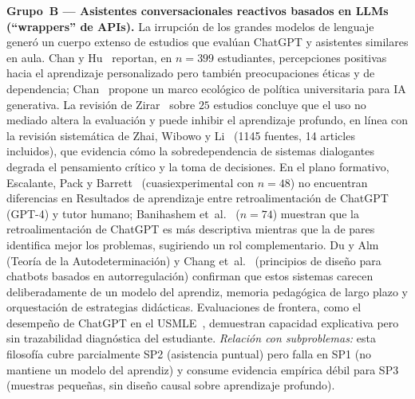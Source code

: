 \textbf{Grupo~B — Asistentes conversacionales reactivos basados en LLMs (``wrappers'' de APIs).}
La irrupción de los grandes modelos de lenguaje generó un cuerpo extenso de estudios que evalúan ChatGPT y asistentes similares en aula. Chan y Hu~\cite{chan_hu2023perceptions} reportan, en $n=399$ estudiantes, percepciones positivas hacia el aprendizaje personalizado pero también preocupaciones éticas y de dependencia; Chan~\cite{chan2023policy} propone un marco ecológico de política universitaria para IA generativa. La revisión de Zirar~\cite{zirar2023chatgpt} sobre $25$ estudios concluye que el uso no mediado altera la evaluación y puede inhibir el aprendizaje profundo, en línea con la revisión sistemática de Zhai, Wibowo y Li~\cite{zhai2024overreliance} (1145 fuentes, 14 articles incluidos), que evidencia cómo la sobredependencia de sistemas dialogantes degrada el pensamiento crítico y la toma de decisiones. En el plano formativo, Escalante, Pack y Barrett~\cite{escalante2023aifeedback} (cuasiexperimental con $n=48$) no encuentran diferencias en Resultados de aprendizaje entre retroalimentación de ChatGPT (GPT-4) y tutor humano; Banihashem et~al.~\cite{banihashem2024feedback} ($n=74$) muestran que la retroalimentación de ChatGPT es más descriptiva mientras que la de pares identifica mejor los problemas, sugiriendo un rol complementario. Du y Alm~\cite{du2024eap} (Teoría de la Autodeterminación) y Chang et~al.~\cite{chang2023srlchatbot} (principios de diseño para chatbots basados en autorregulación) confirman que estos sistemas carecen deliberadamente de un modelo del aprendiz, memoria pedagógica de largo plazo y orquestación de estrategias didácticas. Evaluaciones de frontera, como el desempeño de ChatGPT en el USMLE~\cite{kung2023chatgpt}, demuestran capacidad explicativa pero sin trazabilidad diagnóstica del estudiante. \emph{Relación con subproblemas:} esta filosofía cubre parcialmente SP2 (asistencia puntual) pero falla en SP1 (no mantiene un modelo del aprendiz) y consume evidencia empírica débil para SP3 (muestras pequeñas, sin diseño causal sobre aprendizaje profundo).


